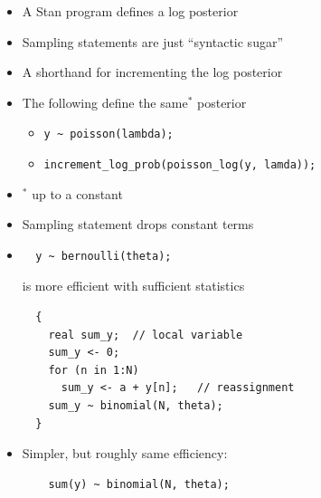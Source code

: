 \documentclass[10pt]{report}
\begin{document}
%
\begin{itemize}
\item A Stan program defines a log posterior
\item Sampling statements are just ``syntactic sugar''
\item A shorthand for incrementing the log posterior
\item The following define the same$^*$ posterior
\begin{itemize}
\item \Verb|y ~ poisson(lambda);|
\item \Verb|increment_log_prob(poisson_log(y, lamda));|
\end{itemize}
\item ${}^{*}$ up to a constant
\item Sampling statement drops constant terms
\end{itemize}


%
\begin{itemize}
\item 
\begin{Verbatim}
  y ~ bernoulli(theta);
\end{Verbatim}
is more efficient with sufficient statistics
{\small
\begin{Verbatim}
  {
    real sum_y;  // local variable
    sum_y <- 0;
    for (n in 1:N)
      sum_y <- a + y[n];   // reassignment
    sum_y ~ binomial(N, theta);
  }
\end{Verbatim}
}
\item Simpler, but roughly same efficiency:
\begin{Verbatim}
    sum(y) ~ binomial(N, theta);
\end{Verbatim}
\end{itemize}
\end{document}
